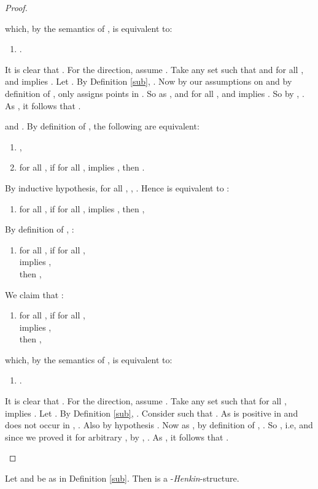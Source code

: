 \documentclass{LMCS}
\begin{document}
\begin{proof}
\begin{iteMize}{}
which, by the semantics of , is equivalent to:
\begin{enumerate}
\item   [].
\end{enumerate}
It is clear that . For the  direction, assume . Take any set  such that  and for all ,  and  implies . Let . By Definition \ref{sub}, . Now by our assumptions on  and by definition of ,  only assigns points in . So as ,  and for all ,  and  implies . So by , . As , it follows that .
\item    and .
By definition of , the following are equivalent:
\begin{enumerate}
\item [] ,
\item []  for all , if for all ,  implies , then .
\end{enumerate}
By inductive hypothesis, for all , , . Hence  is equivalent to :
\begin{enumerate}
\item [] for all , if for all ,  implies , then ,
\end{enumerate}
By definition of , :
\begin{enumerate}
\item [] for all , if for all ,\\
  implies ,\\ then ,
\end{enumerate}
We claim that :
\begin{enumerate}
\item [] for all , if for all ,\\
  implies ,\\
  then ,
\end{enumerate}
which, by the semantics of , is equivalent to:
\begin{enumerate}
\item   [].
\end{enumerate}
It is clear that . For the  direction, assume . Take any set  such that for all ,  implies .  Let . By Definition \ref{sub}, . Consider  such that . As  is positive in  and  does not occur in , . Also by hypothesis . Now as , by definition of , . So , i.e, 
and since we proved it for arbitrary , by , . As , it follows that .
\end{iteMize}
\end{proof}

\begin{thm}
Let  and  be as in Definition \ref{sub}. Then  is a -\emph{Henkin}-structure.
\end{thm}
\end{document}
